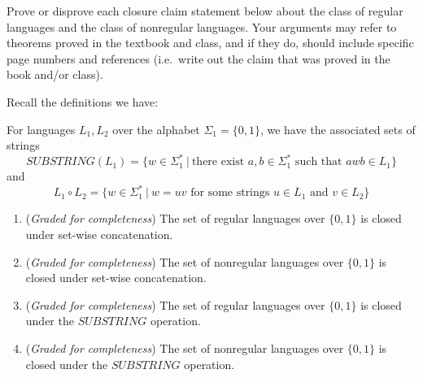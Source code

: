 \documentclass[12pt, oneside]{article}
\newcommand{\gradeComplete}{({\it Graded for completeness}) }
\begin{document}
\begin{enumerate}[wide, labelwidth=!, labelindent=0pt]
Prove or disprove each closure claim statement below about the class of regular languages
and the class of nonregular languages.
Your arguments may refer to theorems proved in the textbook and class, and if they do, should 
include specific page numbers and references (i.e.\ write out the claim that was proved in the book 
and/or class).

Recall the definitions we have: 

For languages $L_1, L_2$ over the alphabet $\Sigma_1 = \{0,1\}$, we have the 
associated sets of strings
\[
   SUBSTRING(L_1) = \{ w \in \Sigma_1^* ~|~ \text{there exist } a,b \in \Sigma_1^* \text{ such that } awb \in L_1\}
\]
and 
\[
   L_1 \circ L_2 = \{ w \in \Sigma_1^* ~|~ w = uv \text{ for some strings } u \in L_1 \text{ and } v \in L_2 \}
\]
\begin{enumerate}

    \item \gradeComplete The set of regular languages over $\{0,1\}$ is closed under set-wise concatenation.

    \item \gradeComplete The set of nonregular languages over $\{0,1\}$ is closed under set-wise concatenation.
 
   \item \gradeComplete The set of regular languages over $\{0,1\}$ is closed under the $SUBSTRING$ operation.

   \item \gradeComplete The set of nonregular languages over $\{0,1\}$ is closed under the $SUBSTRING$ operation.
\end{enumerate}
\end{enumerate}
\end{document}
